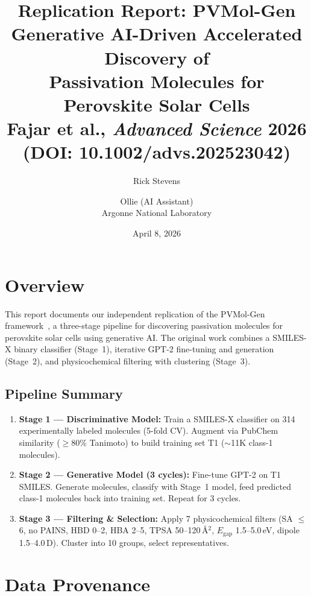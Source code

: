 \documentclass[11pt]{article}
\title{\textbf{Replication Report: PVMol-Gen}\\[0.3em]
\large Generative AI-Driven Accelerated Discovery of\\
Passivation Molecules for Perovskite Solar Cells\\[0.3em]
\normalsize Fajar et al., \textit{Advanced Science} 2026 (DOI: 10.1002/advs.202523042)}
\author{Rick Stevens \and Ollie (AI Assistant)\\
Argonne National Laboratory}
\date{April 8, 2026}
\begin{document}
\maketitle
\thispagestyle{fancy}

\section{Overview}

This report documents our independent replication of the PVMol-Gen framework~\cite{fajar2026}, a three-stage pipeline for discovering passivation molecules for perovskite solar cells using generative AI. The original work combines a SMILES-X binary classifier (Stage~1), iterative GPT-2 fine-tuning and generation (Stage~2), and physicochemical filtering with clustering (Stage~3).

\subsection{Pipeline Summary}

\begin{enumerate}[leftmargin=*]
    \item \textbf{Stage 1 --- Discriminative Model:} Train a SMILES-X classifier on 314 experimentally labeled molecules (5-fold CV). Augment via PubChem similarity ($\geq$80\% Tanimoto) to build training set T1 ($\sim$11K class-1 molecules).
    \item \textbf{Stage 2 --- Generative Model (3 cycles):} Fine-tune GPT-2 on T1 SMILES. Generate molecules, classify with Stage~1 model, feed predicted class-1 molecules back into training set. Repeat for 3 cycles.
    \item \textbf{Stage 3 --- Filtering \& Selection:} Apply 7 physicochemical filters (SA $\leq$ 6, no PAINS, HBD 0--2, HBA 2--5, TPSA 50--120\,\AA$^2$, $E_\mathrm{gap}$ 1.5--5.0\,eV, dipole 1.5--4.0\,D). Cluster into 10 groups, select representatives.
\end{enumerate}

\section{Data Provenance}
\end{document}
